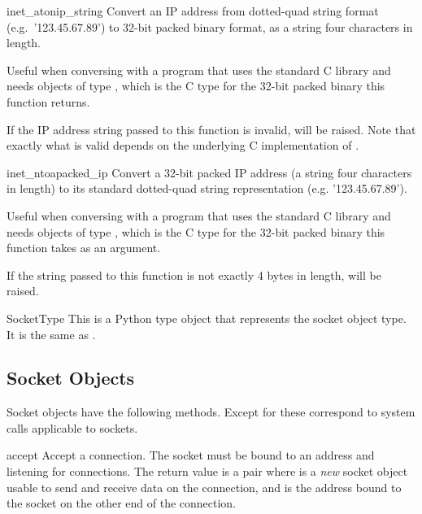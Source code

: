 \begin{funcdesc}{inet_aton}{ip_string}
Convert an IP address from dotted-quad string format
(e.g.\ '123.45.67.89') to 32-bit packed binary format, as a string four
characters in length.

Useful when conversing with a program that uses the standard C library
and needs objects of type , which is the C type
for the 32-bit packed binary this function returns.

If the IP address string passed to this function is invalid,
 will be raised. Note that exactly what is
valid depends on the underlying C implementation of
.
\end{funcdesc}

\begin{funcdesc}{inet_ntoa}{packed_ip}
Convert a 32-bit packed IP address (a string four characters in
length) to its standard dotted-quad string representation
(e.g. '123.45.67.89').

Useful when conversing with a program that uses the standard C library
and needs objects of type , which is the C type
for the 32-bit packed binary this function takes as an argument.

If the string passed to this function is not exactly 4 bytes in
length,  will be raised.
\end{funcdesc}

\begin{datadesc}{SocketType}
This is a Python type object that represents the socket object type.
It is the same as .
\end{datadesc}

\subsection{Socket Objects \label{socket-objects}}

Socket objects have the following methods.  Except for
 these correspond to \UNIX{} system calls
applicable to sockets.

\begin{methoddesc}[socket]{accept}{}
Accept a connection.
The socket must be bound to an address and listening for connections.
The return value is a pair 
where  is a \emph{new} socket object usable to send and
receive data on the connection, and  is the address bound
to the socket on the other end of the connection.
\end{methoddesc}

